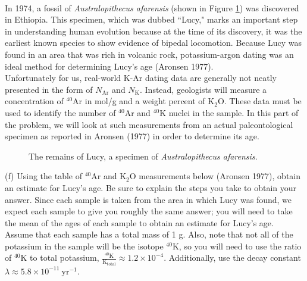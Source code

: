 \documentclass[12pt]{article}    %
\begin{document}
\\


In 1974, a fossil of \textit{Australopithecus afarensis} (shown in Figure \ref{fig:lucy}) was discovered in Ethiopia. This specimen, which was dubbed ``Lucy," marks an important step in understanding human evolution because at the time of
its discovery,  it was the earliest known species to show evidence of bipedal locomotion. Because Lucy was found in an area that was rich in volcanic rock, potassium-argon dating was an ideal method for determining Lucy's age (Aronsen 1977). \\

Unfortunately for us, real-world K-Ar dating data are generally not neatly presented in the form of $N_\mathrm{Ar}$ and $N_\mathrm{K}$. Instead, geologists will measure a concentration of $\mathrm{^{40}Ar}$ in mol/g and a weight percent of $\mathrm{K_2O}$. These data must be used to identify the number of $\mathrm{^{40}Ar}$ and $\mathrm{^{40}K}$ nuclei in the sample. In this part of the problem, we will look at such measurements from an actual paleontological specimen as reported in Aronsen (1977) in order to determine its age.\\


\begin{figure}[h!]
\begin{center}
	\caption{The remains of Lucy, a specimen of \textit{Australopithecus afarensis}.}
	\label{fig:lucy}
\end{center}
\end{figure}


(f) Using the table of $\mathrm{^{40}Ar}$ and $\mathrm{K_2O}$ measurements below (Aronsen 1977), obtain an estimate for Lucy's age. Be sure to explain the steps you take to obtain your answer. Since each sample is taken from the area in which Lucy was found, we expect each sample to give you roughly the same answer; you will need to take the mean of the ages of each sample to obtain an estimate for Lucy's age.\\

\noindent Assume that each sample has a total mass of 1 g. Also, note that not all of the potassium in the sample will be the isotope $^{40}\mathrm{K}$, so you will need to use the ratio of $^{40}\mathrm{K}$ to total potassium, $\mathrm{\frac{^{40}K}{K_{total}}} \approx 1.2 \times 10^{-4}$. Additionally, use the decay constant $\lambda \approx 5.8 \times 10^{-11}\ \mathrm{yr}^{-1}$. \\
\end{document}
